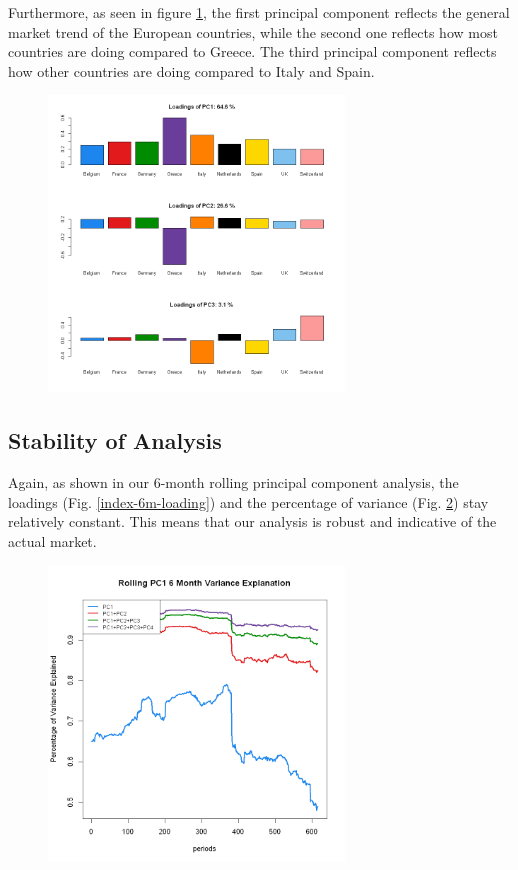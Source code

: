 \documentclass{article}
\begin{document}
Furthermore, as seen in figure \ref{index_loadings}, the first principal component reflects the general market trend of the European countries, while the second one reflects how most countries are doing compared to Greece. The third principal component reflects how other countries are doing compared to Italy and Spain.

\begin{figure}[H]
    \caption{}
    \centering
    \includegraphics[width=0.7\textwidth]{index_loading1.png}
    \label{index_loadings}
\end{figure}


\subsection{Stability of Analysis}

Again, as shown in our 6-month rolling principal component analysis, the loadings (Fig. \ref{index-6m-loading}) and the percentage of variance (Fig. \ref{index-6m-var}) stay relatively constant. This means that our analysis is robust and indicative of the actual market.

\begin{figure}[H]
    \caption{}
    \centering
    \includegraphics[width=0.7\textwidth]{index_6Mvar.png}
    \label{index-6m-var}
\end{figure}
\end{document}
